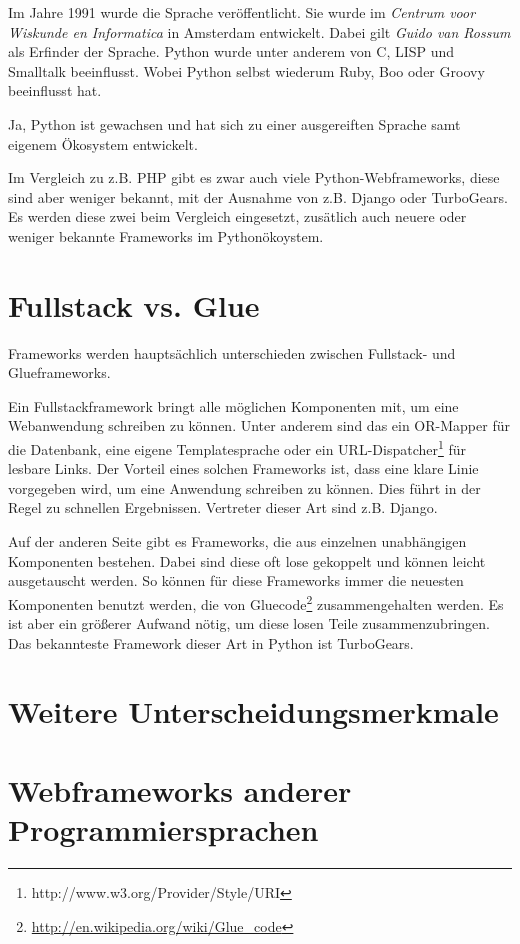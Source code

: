 Im Jahre 1991 wurde die Sprache veröffentlicht. Sie wurde im \emph{Centrum voor
Wiskunde en Informatica} in Amsterdam entwickelt. Dabei gilt \emph{Guido van
Rossum} als Erfinder der Sprache. Python wurde unter anderem von C, LISP und
Smalltalk beeinflusst. Wobei Python selbst wiederum Ruby, Boo oder Groovy
beeinflusst hat.

Ja, Python ist gewachsen und hat sich zu einer ausgereiften Sprache samt
eigenem Ökosystem entwickelt.\cite{Python08}

Im Vergleich zu z.B. PHP\cite{phpwebframeworks} gibt es zwar auch viele
Python-Webframeworks\cite{pythonwebframeworks}, diese sind aber weniger
bekannt, mit der Ausnahme von z.B. Django oder TurboGears. Es werden diese zwei
beim Vergleich eingesetzt, zusätlich auch neuere oder weniger bekannte
Frameworks im Pythonökoystem.


\section{Fullstack vs. Glue}
Frameworks werden hauptsächlich unterschieden zwischen Fullstack- und
Glueframeworks.

Ein Fullstackframework bringt alle möglichen Komponenten mit,
um eine Webanwendung schreiben zu können. Unter anderem sind das ein OR-Mapper
für die Datenbank, eine eigene Templatesprache oder ein
URL-Dispatcher\footnote{http://www.w3.org/Provider/Style/URI} für lesbare
Links. Der Vorteil eines solchen Frameworks ist, dass eine klare Linie 
vorgegeben wird, um eine Anwendung schreiben zu können. Dies führt in der Regel
zu schnellen Ergebnissen. Vertreter dieser Art sind z.B. Django.

Auf der anderen Seite gibt es Frameworks, die aus einzelnen
unabhängigen Komponenten bestehen. Dabei sind diese oft lose gekoppelt und
können leicht ausgetauscht werden. So können für diese Frameworks immer die 
neuesten Komponenten benutzt werden, die von
Gluecode\footnote{\url{http://en.wikipedia.org/wiki/Glue_code}} zusammengehalten
werden. Es ist aber ein größerer Aufwand nötig, um diese losen Teile 
zusammenzubringen. Das bekannteste Framework dieser Art in Python ist TurboGears.

\section{Weitere Unterscheidungsmerkmale}

\section{Webframeworks anderer Programmiersprachen }
